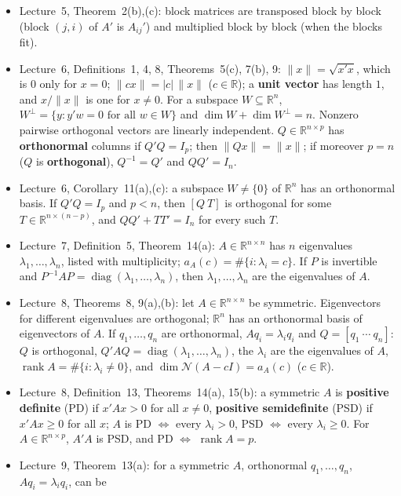 \documentclass[12pt]{article}
\newcommand{\R}{\mathbb R}
\DeclareMathOperator{\diag}{diag}
\DeclareMathOperator{\rank}{rank}
\theoremstyle{definition}
\newcommand{\lec}[1]{Lecture~#1}
\begin{document}
\begin{itemize}[itemsep=0pt,parsep=0pt,topsep=2pt]
\(\rank(A'A)=\rank A=\rank(AA')\).
\item \lec{5}, Theorem~2(b),(c): block matrices are transposed block by block (block \((j,i)\) of \(A'\) is
\(A_{ij}'\)) and multiplied block by block (when the blocks fit).
\item \lec{6}, Definitions~1, 4, 8, Theorems~5(c), 7(b), 9: \(\lVert x\rVert=\sqrt{x'x}\), which is \(0\) only for
\(x=0\); \(\lVert cx\rVert=\lvert c\rvert\,\lVert x\rVert\) (\(c\in\R\)); a \textbf{unit vector} has length \(1\), and
\(x/\lVert x\rVert\) is one for \(x\ne0\). For a subspace \(W\subseteq\R^n\),
\(W^\perp=\{y:y'w=0\text{ for all }w\in W\}\) and \(\dim W+\dim W^\perp=n\). Nonzero pairwise orthogonal vectors are
linearly independent. \(Q\in\R^{n\times p}\) has \textbf{orthonormal} columns if \(Q'Q=I_p\); then
\(\lVert Qx\rVert=\lVert x\rVert\); if moreover \(p=n\) (\(Q\) is \textbf{orthogonal}), \(Q^{-1}=Q'\) and \(QQ'=I_n\).
\item \lec{6}, Corollary~11(a),(c): a subspace \(W\ne\{0\}\) of \(\R^n\) has an orthonormal basis. If \(Q'Q=I_p\) and
\(p<n\), then \([Q\ T]\) is orthogonal for some \(T\in\R^{n\times(n-p)}\), and \(QQ'+TT'=I_n\) for every such \(T\).
\item \lec{7}, Definition~5, Theorem~14(a): \(A\in\R^{n\times n}\) has \(n\) eigenvalues \(\lambda_1,\dots,\lambda_n\),
listed with multiplicity; \(a_A(c)=\#\{i:\lambda_i=c\}\). If \(P\) is invertible and
\(P^{-1}AP=\diag(\lambda_1,\dots,\lambda_n)\), then \(\lambda_1,\dots,\lambda_n\) are the eigenvalues of \(A\).
\item \lec{8}, Theorems~8, 9(a),(b): let \(A\in\R^{n\times n}\) be symmetric. Eigenvectors for different eigenvalues
are orthogonal; \(\R^n\) has an orthonormal basis of eigenvectors of \(A\). If \(q_1,\dots,q_n\) are orthonormal,
\(Aq_i=\lambda_iq_i\) and \(Q=[q_1\ \cdots\ q_n]\): \(Q\) is orthogonal, \(Q'AQ=\diag(\lambda_1,\dots,\lambda_n)\), the
\(\lambda_i\) are the eigenvalues of \(A\), \(\rank A=\#\{i:\lambda_i\ne0\}\), and \(\dim\mathcal N(A-cI)=a_A(c)\)
(\(c\in\R\)).
\item \lec{8}, Definition~13, Theorems~14(a), 15(b): a symmetric \(A\) is \textbf{positive definite} (PD) if
\(x'Ax>0\) for all \(x\ne0\), \textbf{positive semidefinite} (PSD) if \(x'Ax\geqslant0\) for all \(x\); \(A\) is PD
\(\iff\) every \(\lambda_i>0\), PSD \(\iff\) every \(\lambda_i\geqslant0\). For \(A\in\R^{n\times p}\), \(A'A\) is PSD,
and PD \(\iff\) \(\rank A=p\).
\item \lec{9}, Theorem~13(a): for a symmetric \(A\), orthonormal \(q_1,\dots,q_n\), \(Aq_i=\lambda_iq_i\), can be

\end{itemize}
\end{document}
